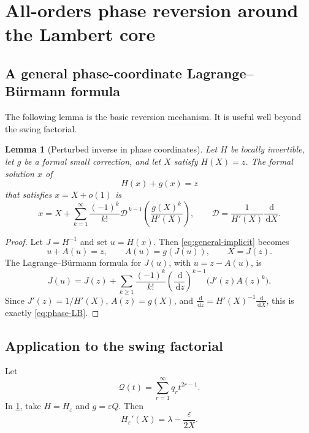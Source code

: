 \documentclass[11pt]{article}
\newtheorem{lemma}[theorem]{Lemma}
\theoremstyle{definition}
\theoremstyle{remark}
\newcommand{\eps}{\varepsilon}
\newcommand{\lam}{\lambda}
\newcommand{\dd}{\,\mathrm d}
\newcommand{\Qf}{\mathcal Q}
\begin{document}
\section{All-orders phase reversion around the Lambert core}

\subsection{A general phase-coordinate Lagrange--B\"urmann formula}

The following lemma is the basic reversion mechanism.  It is useful well beyond the swing factorial.

\begin{lemma}[Perturbed inverse in phase coordinates]\label{lem:phase-LB}
Let $H$ be locally invertible, let $g$ be a formal small correction, and let $X$ satisfy $H(X)=z$.  The formal solution $x$ of
\begin{equation}\label{eq:general-implicit}
 H(x)+g(x)=z
\end{equation}
that satisfies $x=X+o(1)$ is
\begin{equation}\label{eq:phase-LB}
 x=X+\sum_{k=1}^\infty\frac{(-1)^k}{k!}
 \mathscr D^{\,k-1}
 \left(\frac{g(X)^k}{H'(X)}\right),
 \qquad
 \mathscr D=\frac1{H'(X)}\frac{\dd}{\dd X}.
\end{equation}
\end{lemma}

\begin{proof}
Let $J=H^{-1}$ and set $u=H(x)$.  Then \eqref{eq:general-implicit} becomes
\[
 u+A(u)=z,
 \qquad A(u)=g(J(u)),
 \qquad X=J(z).
\]
The Lagrange--B\"urmann formula for $J(u)$, with $u=z-A(u)$, is
\[
 J(u)=J(z)+\sum_{k\ge1}\frac{(-1)^k}{k!}
 \left(\frac{\dd}{\dd z}\right)^{k-1}
 \bigl(J'(z)A(z)^k\bigr).
\]
Since $J'(z)=1/H'(X)$, $A(z)=g(X)$, and
$\frac{\dd}{\dd z}=H'(X)^{-1}\frac{\dd}{\dd X}$, this is exactly \eqref{eq:phase-LB}.
\end{proof}

\subsection{Application to the swing factorial}

Let
\begin{equation}\label{eq:Qformal}
 \Qf(t)=\sum_{r=1}^\infty q_rt^{2r-1}.
\end{equation}
In \cref{lem:phase-LB}, take $H=H_\eps$ and $g=\eps Q$.  Then
\begin{equation}\label{eq:Hprime}
 H_\eps'(X)=\lam-\frac\eps{2X}.
\end{equation}
\end{document}
